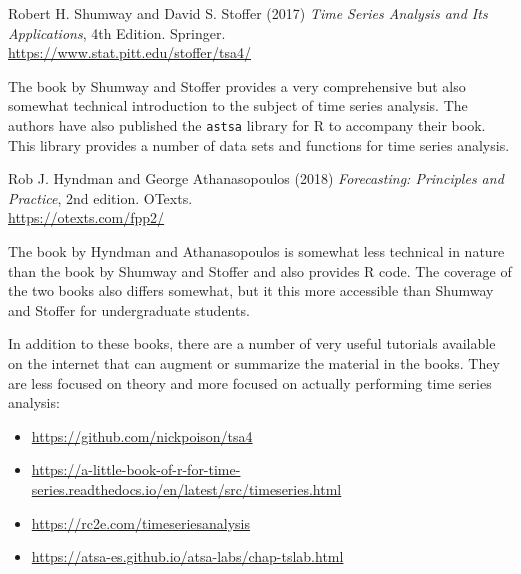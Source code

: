 \begin{resourcebox}
Robert H. Shumway and David S. Stoffer (2017) \emph{Time Series Analysis and Its Applications}, 4th Edition. Springer.\\

\small\url{https://www.stat.pitt.edu/stoffer/tsa4/}\normalsize
\end{resourcebox}

The book by Shumway and Stoffer provides a very comprehensive but also somewhat technical introduction to the subject of time series analysis. The authors have also published the \texttt{astsa} library for R to accompany their book. This library provides a number of data sets and functions for time series analysis. 

\begin{resourcebox}
Rob J. Hyndman and George Athanasopoulos (2018) \emph{Forecasting: Principles and Practice}, 2nd edition. OTexts. \\

\url{https://otexts.com/fpp2/} 
\end{resourcebox}

\begin{withcode}
The book by Hyndman and Athanasopoulos is somewhat less technical in nature than the book by Shumway and Stoffer and also provides R code. The coverage of the two books also differs somewhat, but it this more accessible than Shumway and Stoffer for undergraduate students.

\begin{resourcebox}
In addition to these books, there are a number of very useful tutorials available on the internet that can augment or summarize the material in the books. They are less focused on theory and more focused on actually performing time series analysis:\\

\begin{itemize}
\small
\item \url{https://github.com/nickpoison/tsa4}
\item \url{https://a-little-book-of-r-for-time-series.readthedocs.io/en/latest/src/timeseries.html}
\item \url{https://rc2e.com/timeseriesanalysis}
\item \url{https://atsa-es.github.io/atsa-labs/chap-tslab.html}
\normalsize
\end{itemize}
\end{resourcebox}
\end{withcode}

